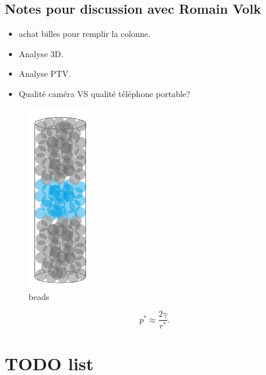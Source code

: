 \documentclass[twocolumn,amsmath,amssymb,floatfix]{article}
\begin{document}
\subsection{Notes pour discussion avec Romain Volk}

\begin{itemize}
    \item achat billes pour remplir la colonne.
    \item Analyse 3D.
    \item Analyse PTV.
    \item Qualité caméra VS qualité téléphone portable?
\end{itemize}


\begin{figure}
\includegraphics[height=8cm]{figures/beadsStack.png}
\caption{beads}
\label{fig:beads}
\end{figure}


% 
% 
\begin{equation}
p^{*}\approx \frac{2\gamma}{r^{*}}.\label{eq:ppit}
\end{equation}

\section{TODO list}
\end{document}
